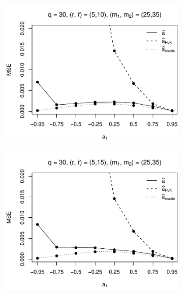 \begin{figure}[p]
\begin{subfigure}[b]{0.45\textwidth}
\includegraphics[width=\textwidth]{Plots/Plots_Supplement/MSE_a_zoom_T=500_slope=10_(L1,L2,K1,K2,M1,M2)=(30,30,5,10,25,35).pdf}
\end{subfigure}
\hspace{0.25cm}
\begin{subfigure}[b]{0.45\textwidth}
\includegraphics[width=\textwidth]{Plots/Plots_Supplement/MSE_a_zoom_T=500_slope=10_(L1,L2,K1,K2,M1,M2)=(30,30,5,15,25,35).pdf}
\end{subfigure}


\end{figure}
